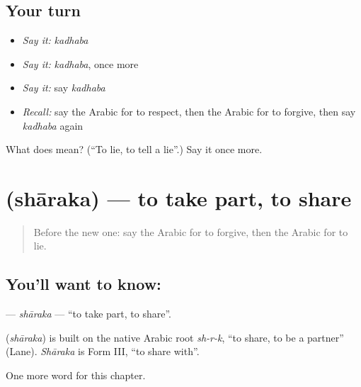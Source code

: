\subsection*{Your turn}
\begin{itemize}
\raggedright
  \item \emph{Say it:} \emph{kadhaba}
  \item \emph{Say it:} \emph{kadhaba}, once more
  \item \emph{Say it:} say \emph{kadhaba}
  \item \emph{Recall:} say the Arabic for to respect, then the Arabic for to forgive, then say \emph{kadhaba} again
\end{itemize}

\begin{tcolorbox}[breakable,colback=teal!4,colframe=teal!35!black,title={Before you move on}]
What does  mean? (\textquotedblleft{}To lie, to tell a lie\textquotedblright{}.) Say it once more.
\end{tcolorbox}
\section[\texorpdfstring{\ar{شارك} (shāraka)}{شارك (shāraka)}]{ (shāraka) — to take part, to share}

\label{lesson:AR-C258-sharaka}



\begin{quote}
Before the new one: say the Arabic for to forgive, then the Arabic for to lie.
\end{quote}

\subsection*{You'll want to know: }
\textbf{} — \emph{shāraka} — \textquotedblleft{}to take part, to share\textquotedblright{}.

\begin{cousinweb}
\textbf{} (\emph{shāraka}) is built on the native Arabic root \emph{sh-r-k}, \textquotedblleft{}to share, to be a partner\textquotedblright{} (Lane). \emph{Shāraka} is Form III, \textquotedblleft{}to share with\textquotedblright{}.
\end{cousinweb}

\begin{grammarlens}[title={What you've built}]
One more word for this chapter.
\end{grammarlens}

